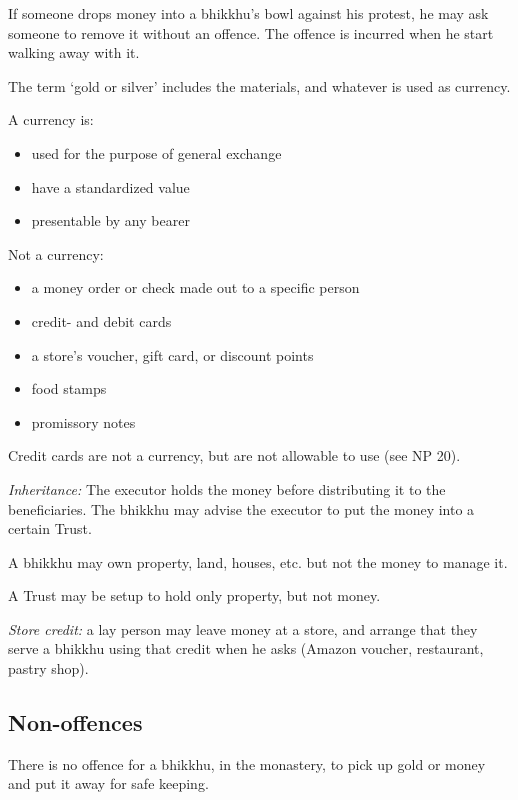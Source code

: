 If someone drops money into a bhikkhu's bowl against his protest, he may
ask someone to remove it without an offence. The offence is incurred
when he start walking away with it.

The term `gold or silver' includes the materials, and whatever is used
as currency.

\enlargethispage*{\baselineskip}

A currency is:

\begin{itemize}
\tightlist
\item
  used for the purpose of general exchange
\item
  have a standardized value
\item
  presentable by any bearer
\end{itemize}

\clearpage

Not a currency:

\begin{itemize}
\tightlist
\item
  a money order or check made out to a specific person
\item
  credit- and debit cards
\item
  a store's voucher, gift card, or discount points
\item
  food stamps
\item
  promissory notes
\end{itemize}

Credit cards are not a currency, but are not allowable to use (see NP
20).

\emph{Inheritance:} The executor holds the money before distributing it
to the beneficiaries. The bhikkhu may advise the executor to put the
money into a certain Trust.

A bhikkhu may own property, land, houses, etc. but not the money to
manage it.

A Trust may be setup to hold only property, but not money.

\emph{Store credit:} a lay person may leave money at a store, and
arrange that they serve a bhikkhu using that credit when he asks (Amazon
voucher, restaurant, pastry shop).

\subsection{Non-offences}

There is no offence for a bhikkhu, in the monastery, to pick up gold or
money and put it away for safe keeping.

